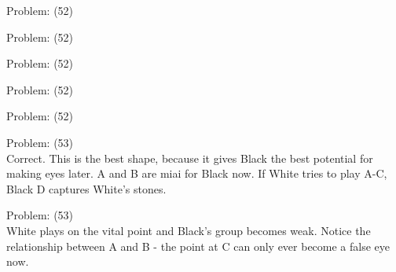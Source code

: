 \documentclass[11pt]{article}
\begin{document}
\begin{minipage}[t]{0.5\textwidth}
  {\centering
  
Problem: (52)\\
  }
\end{minipage}
\begin{minipage}[t]{0.5\textwidth}
  {\centering
  
Problem: (52)\\
  }
\end{minipage}
\begin{minipage}[t]{0.5\textwidth}
  {\centering
  
Problem: (52)\\
  }
\end{minipage}
\begin{minipage}[t]{0.5\textwidth}
  {\centering
  
Problem: (52)\\
  }
\end{minipage}
\begin{minipage}[t]{0.5\textwidth}
  {\centering
  
Problem: (52)\\
  }
\end{minipage}
\begin{minipage}[t]{0.5\textwidth}
  {\centering
  
Problem: (53)\\
Correct. This is the best shape, because it gives Black the best potential for making eyes later. A and B are miai for Black now. If White tries to play A-C, Black D captures White's stones.\\
  }
\end{minipage}
\begin{minipage}[t]{0.5\textwidth}
  {\centering
  
Problem: (53)\\
White plays on the vital point and Black's group becomes weak. Notice the relationship between A and B - the point at C can only ever become a false eye now.\\
  }
\end{minipage}
\end{document}
